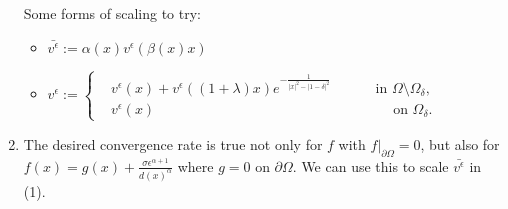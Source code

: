 \documentclass[english,reqno]{amsart}
\begin{document}
\begin{enumerate}[label=\arabic*)]
Some forms of scaling to try:
\begin{itemize}
    \item $\bar{v^\epsilon} := \alpha(x) v^\epsilon \left(\beta(x) x \right)$
    \item $v^\epsilon:= \left\{
  \begin{aligned}
   &v^\epsilon(x) + v^\epsilon \left((1+\lambda)x \right)e^{-\displaystyle \frac{1}{|x|^2-|1-\delta|^2}} \, \quad \qquad \text{in } \Omega \setminus \Omega_\delta, \\
              &v^\epsilon(x) \qquad \qquad \qquad \qquad \qquad \qquad \quad \qquad \qquad  \text{on } \Omega_\delta.
  \end{aligned}
\right.$
\end{itemize}
\item The desired convergence rate is true not only for $f$ with $f|_{\partial \Omega} = 0$, but also for $\displaystyle f(x) = g(x) + \frac{\sigma \epsilon^{\alpha + 1}}{d(x)^\alpha}$ where $g=0$ on $\partial \Omega$. We can use this to scale $\bar{v^\epsilon}$ in (1).


\end{enumerate}
\end{document}

